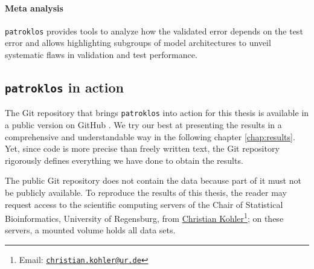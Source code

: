 \paragraph{Meta analysis} 
\texttt{patroklos} provides tools to analyze how the validated error depends on the test error and 
allows highlighting subgroups of model architectures to unveil systematic flaws in validation 
and test performance.

\subsection{\texttt{patroklos} in action}

The Git repository that brings \texttt{patroklos} into action for this thesis is available in a 
public version on GitHub \cite{thesis-gh}. We try our best at presenting the results in a 
comprehensive and understandable way in the following chapter \ref{chap:results}. Yet, since code 
is more precise than freely written text, the Git repository rigorously defines everything we have 
done to obtain the results.

The public Git repository does not contain the data because part of it must not be publicly 
available. To reproduce the results of this thesis, the reader may request access to the scientific 
computing servers of the Chair of Statistical Bioinformatics, University of Regensburg, from 
\href{mailto:christian.kohler@ur.de}{Christian Kohler}\footnote{Email: 
\href{mailto:christian.kohler@ur.de}{\texttt{christian.kohler@ur.de}}}; on these servers, a mounted
volume holds all data sets.